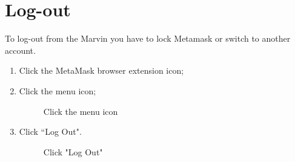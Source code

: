 \documentclass[ManualeUtente]{subfiles}
\begin{document}
\section{Log-out}
To log-out from the Marvin you have to lock Metamask or switch to another account.
\begin{enumerate}
	\item Click the MetaMask browser extension icon;
	\item Click the menu icon;
	\begin{figure}[H]
		\centering
		\caption{Click the menu icon}
		\label{fig:Click the menu icon}
	\end{figure}
	\item Click \textquotedblleft Log Out".
	\begin{figure}[H]
		\centering
		\caption{Click "Log Out"}
		\label{fig:Click "Log Out"}
	\end{figure}
\end{enumerate}
\end{document}

